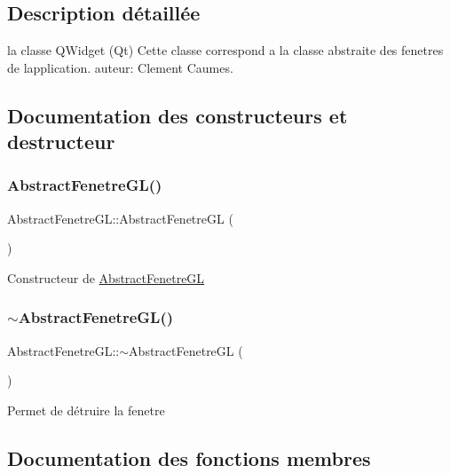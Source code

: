 \subsection{Description détaillée}
la classe Q\+Widget (Qt) Cette classe correspond a la classe abstraite des fenetres de l\textquotesingle{}application. auteur\+: Clement Caumes. 

\subsection{Documentation des constructeurs et destructeur}
\mbox{\label{classAbstractFenetreGL_a48a1ccd1d08fb471401b37cebed8fd74}} 
\subsubsection{\texorpdfstring{Abstract\+Fenetre\+G\+L()}{AbstractFenetreGL()}}
{\footnotesize\ttfamily Abstract\+Fenetre\+G\+L\+::\+Abstract\+Fenetre\+GL (\begin{DoxyParamCaption}{ }\end{DoxyParamCaption})}

Constructeur de \hyperlink{classAbstractFenetreGL}{Abstract\+Fenetre\+GL} \mbox{\label{classAbstractFenetreGL_a848254ecf6e365f84bec581900b17d65}} 
\subsubsection{\texorpdfstring{$\sim$\+Abstract\+Fenetre\+G\+L()}{~AbstractFenetreGL()}}
{\footnotesize\ttfamily Abstract\+Fenetre\+G\+L\+::$\sim$\+Abstract\+Fenetre\+GL (\begin{DoxyParamCaption}{ }\end{DoxyParamCaption})}

Permet de détruire la fenetre 

\subsection{Documentation des fonctions membres}
\mbox{\label{classAbstractFenetreGL_a97c30b1012a2eaa09bb3aed0403ff595}} 
